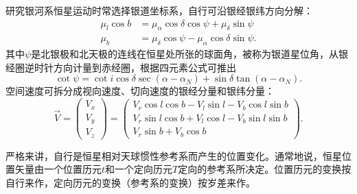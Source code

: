 \documentclass[11pt, a4paper, oneside]{ctexart}
\numberwithin{equation}{subsection}
\begin{document}
研究银河系恒星运动时常选择银道坐标系，自行可沿银经银纬方向分解：
\begin{align}
\mu_l\cos b&=\mu_\alpha\cos\delta\cos\psi+\mu_\delta\sin\psi\\
\mu_b&=\mu_\delta\cos\psi-\mu_\alpha\cos\delta\sin\psi.
\end{align}
其中$\psi$是北银极和北天极的连线在恒星处所张的球面角，被称为银道星位角，从银经圈逆时针方向计量到赤经圈，根据四元素公式可推出
\begin{equation}
\cot\psi=\cot i\cos\delta\sec\left(\alpha-\alpha_N\right)+\sin\delta\tan\left(\alpha-\alpha_N\right).
\end{equation}
空间速度可拆分成视向速度、切向速度的银经分量和银纬分量：
\begin{equation}
\vec V=\begin{pmatrix}
V_x\\
V_y\\
V_z
\end{pmatrix}=\begin{pmatrix}
V_r\cos l\cos b-V_l\sin l-V_b\cos l\sin b\\
V_r\sin l\cos b+V_l\cos l-V_b\sin l\sin b\\
V_r\sin b+V_b\cos b
\end{pmatrix}.
\end{equation}

严格来讲，自行是恒星相对天球惯性参考系而产生的位置变化。通常地说，恒星位置矢量由一个位置历元$t$和一个定向历元$T$定向的参考系所决定。位置历元的变换按自行来作，定向历元的变换（参考系的变换）按岁差来作。
\end{document}
